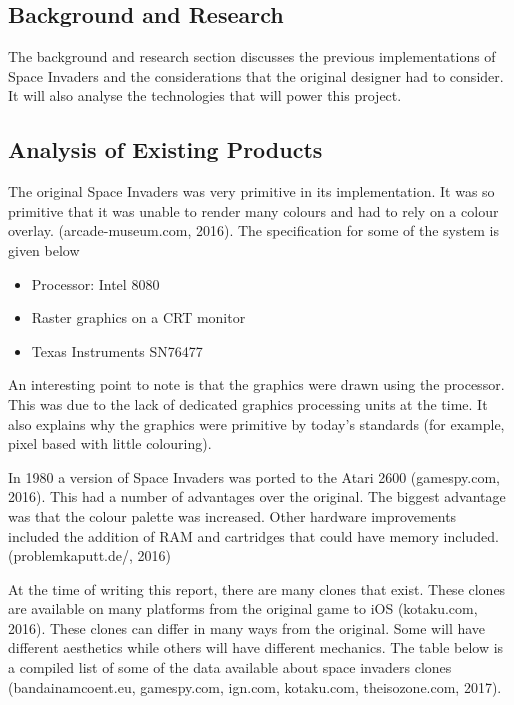 \documentclass[12pt]{article}
\begin{document}
\begin{center}
\section{Background and Research}
\end{center}
The background and research section discusses the previous implementations of Space Invaders and the considerations that the original designer had to consider. It will also analyse the technologies that will power this project. 

\begin{center}
\subsection{Analysis of Existing Products}
\end{center}
The original Space Invaders was very primitive in its implementation. It was so primitive that it was unable to render many colours and had to rely on a colour overlay. (arcade-museum.com, 2016). The specification for some of the system is given below


\begin{itemize}
	\item Processor: Intel 8080
	\item Raster graphics on a CRT monitor
	\item Texas Instruments SN76477
\end{itemize}

An interesting point to note is that the graphics were drawn using the processor. This was due to the lack of dedicated graphics processing units at the time. It also explains why the graphics were primitive by today's standards (for example, pixel based with little colouring).

In 1980 a version of Space Invaders was ported to the Atari 2600 (gamespy.com, 2016). This had a number of advantages over the original. The biggest advantage was that the colour palette was increased. Other hardware improvements included the addition of RAM and cartridges that could have memory included. (problemkaputt.de/, 2016)

At the time of writing this report, there are many clones that exist. These clones are available on many platforms from the original game to iOS (kotaku.com, 2016). These clones can differ in many ways from the original. Some will have different aesthetics while others will have different mechanics. The table below is a compiled list of some of the data available about space invaders clones (bandainamcoent.eu, gamespy.com, ign.com, kotaku.com, theisozone.com, 2017).
\end{document}
